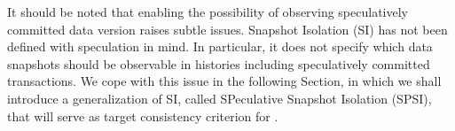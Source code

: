 %
%

It should be noted that enabling the possibility of observing speculatively committed data version raises subtle issues.  Snapshot Isolation (SI) has not been defined with speculation in mind. In particular, it does not specify which data snapshots should be observable in histories including speculatively committed transactions. We cope with this issue in the following Section, in which we shall introduce a generalization of SI, called SPeculative Snapshot Isolation (SPSI), that will serve as target consistency criterion for \specula.



